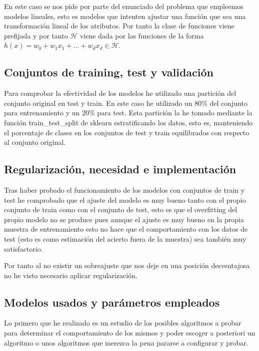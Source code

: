 \documentclass[12pt,a4paper]{article}
\begin{document}
En este caso se nos pide por parte del enunciado del problema que empleemos modelos lineales, esto es modelos que intenten ajustar una función que sea una transformación lineal de los atributos. Por tanto la clase de funciones viene prefijada y por tanto $\mathcal{H}$ viene dada por las funciones de la forma $h(x) = w_0 + w_1 x_1 + ... + w_d x_d \in \mathcal{H}$.

\subsection{Conjuntos de training, test y validación}

Para comprobar la efectividad de los modelos he utilizado una partición del conjunto original en test y train. En este caso he utilizado un 80\% del conjunto para entrenamiento y un 20\% para test. Esta partición la he tomado mediante la función train\_test\_split de sklearn estratificando los datos, esto es, manteniendo el porcentaje de clases en los conjuntos de test y train equilibrados con respecto al conjunto original.

\subsection{Regularización, necesidad e implementación}

Tras haber probado el funcionamiento de los modelos con conjuntos de train y test he comprobado que el ajuste del modelo es muy bueno tanto con el propio conjunto de train como con el conjunto de test, esto es que el overfitting del propio modelo no se produce pues aunque el ajuste es muy bueno en la propia muestra de entrenamiento esto no hace que el comportamiento con los datos de test (esto es como estimación del acierto fuera de la muestra) sea también muy satisfactorio.

Por tanto al no existir un sobreajuste que nos deje en una posición desventajosa no he visto necesario aplicar regularización.

\subsection{Modelos usados y parámetros empleados}

Lo primero que he realizado es un estudio de los posibles algoritmos a probar para determinar el comportamiento de los mismos y poder escoger a posteriori un algoritmo o unos algoritmos que merezca la pena pararse a configurar y probar.
\end{document}

